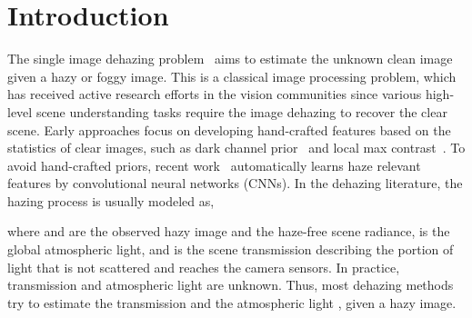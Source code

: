 \documentclass[10pt,twocolumn,letterpaper]{article}
\begin{document}
\section{Introduction}
\vspace{-0.1cm}
The single image dehazing problem~\cite{he2011singlecvpr,zhang2015retina} aims to estimate the unknown clean image given a hazy or foggy image. This is a classical
image processing problem, which has received active research efforts in the vision communities since various high-level scene understanding tasks \cite{liu2018cross,sakaridis2017semantic,song_wacv14_decolor,yuan2017temporal} require the image dehazing to recover the clear scene. 
Early approaches focus on developing hand-crafted features based on the statistics of clear images, such as dark channel prior~\cite{he2011singlecvpr} and local max contrast~\cite{bao_icpr12_filter,tan2008visibility}.
To avoid hand-crafted priors, recent work~\cite{cai2016dehazenet,li2017aod,ren2016single,He_dehaze_2018} automatically learns haze relevant features by convolutional neural networks (CNNs).
In the dehazing literature, the hazing process is usually modeled as,

where  and  are the observed hazy image and the haze-free scene radiance,  is the global atmospheric
light, and  is the scene transmission describing the portion of light
that is not scattered and reaches the camera sensors.
In practice, transmission and atmospheric light are unknown.
Thus, most dehazing methods try to estimate the transmission 
and the atmospheric light , given a hazy image.
\end{document}

